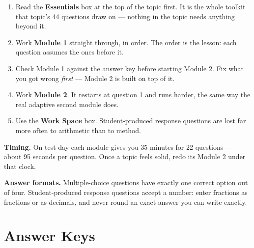\documentclass[11pt,a4paper,oneside]{book}
\begin{document}
\begin{essentials}
\begin{enumerate}[leftmargin=1.4em]
  \item Read the \textbf{Essentials} box at the top of the topic first. It is
        the whole toolkit that topic's 44 questions draw on --- nothing in the
        topic needs anything beyond it.
  \item Work \textbf{Module 1} straight through, in order. The order is the
        lesson: each question assumes the ones before it.
  \item Check Module 1 against the answer key before starting Module 2. Fix
        what you got wrong \emph{first} --- Module 2 is built on top of it.
  \item Work \textbf{Module 2}. It restarts at question 1 and runs harder,
        the same way the real adaptive second module does.
  \item Use the \textbf{Work Space} box. Student-produced response questions
        are lost far more often to arithmetic than to method.
\end{enumerate}
\end{essentials}

\vspace{4pt}
{\small\color{inkgray}
\textbf{Timing.} On test day each module gives you 35 minutes for 22
questions --- about 95 seconds per question. Once a topic feels solid, redo
its Module 2 under that clock.\par\vspace{4pt}
\textbf{Answer formats.} Multiple-choice questions have exactly one correct
option out of four. Student-produced response questions accept a number:
enter fractions as fractions or as decimals, and never round an exact answer
you can write exactly.}

\clearpage



\clearpage
{}
\chapter*{Answer Keys}


\end{document}
